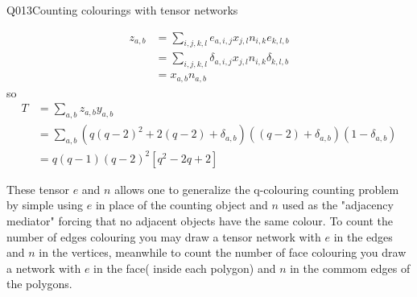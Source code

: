 \begin{entry}{Q013}{Counting colourings with tensor networks}
\begin{solution}[Part (a)]
\begin{equation}
\begin{split}
    z_{a,b}&= \sum_{i,j,k,l}e_{a,i,j}x_{j,l}n_{i,k}e_{k,l,b}\\
    &=\sum_{i,j,k,l}\delta_{a,i,j}x_{j,l}n_{i,k}\delta_{k,l,b}\\
    &= x_{a,b}n_{a,b}
\end{split}
\end{equation}
so
\begin{equation}
\begin{split}
    T&=\sum_{a,b} z_{a,b}y_{a,b}\\
    &= \sum_{a,b} (q(q-2)^2+ 2(q-2) + \delta_{a,b})((q-2)+\delta_{a,b})(1-\delta_{a,b})\\
    &= q(q-1)(q-2)^2[q^2-2q+2]
\end{split}
\end{equation}


\end{solution}

\begin{solution}[Part (b)]
These tensor $e$ and $n$ allows one to generalize the q-colouring counting problem by simple using $e$ in place of the counting object and $n$ used as the "adjacency mediator"  forcing that no adjacent objects have the same colour. To count the number of edges colouring you may draw a tensor network with $e$ in the edges and $n$ in the vertices, meanwhile to count the number of face colouring you draw a network with $e$ in the face( inside each polygon) and $n$ in the commom edges of the polygons. 
\end{solution}






\end{entry}